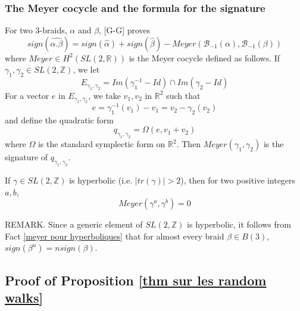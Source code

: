 \documentclass[12pt]{article}
\begin{document}
\subsubsection{The Meyer cocycle and the formula for the signature}\label{meyer}
\label{section sur le meyer cocycle}
For two $3$-braids, $\alpha$ and $\beta$, [G-G] proves  
\begin{equation}\label{formule de gg}
sign(\widehat{\alpha.\beta})=
sign(\hat{\alpha})+sign(\hat{\beta})-
Meyer({\mathcal B}_{-1}(\alpha),{\mathcal B}_{-1}(\beta))
\end{equation}
where $Meyer\in H^2(SL(2,\mathbb{R}))$ is the Meyer cocycle defined as follows.
If $\gamma_1,\gamma_2\in SL(2,\mathbb{Z})$, we let
\begin{equation}\label{e.gamma.un.gamma.deux}
E_{\gamma_1,\gamma_2}=Im(\gamma_1^{-1}-Id)\cap Im(\gamma_2-Id)
\end{equation}
For a vector $e$ in $E_{\gamma_1,\gamma_2}$, we take $v_1,v_2$ in $\mathbb{R}^2$ such that 
$$e=\gamma_1^{-1}(v_1)-v_1=v_2-\gamma_2(v_2)$$
and define the quadratic form 
\begin{equation}\label{e.gamma.un.gamma.deux}
q_{\gamma_1,\gamma_2}=\Omega(e,v_1+v_2)
\end{equation}
where $\Omega$ is the standard symplectic form on $\mathbb{R}^2$.
Then $Meyer (\gamma_1,\gamma_2)$ is the signature of $q_{\gamma_1,\gamma_2}$.







\begin{fact}\label{meyer pour hyperboliques}
	If $\gamma\in SL(2,\mathbb{Z})$ is hyperbolic (i.e. $|tr(\gamma)|>2$), then for two positive integers $a,b$, $$Meyer(\gamma^a,\gamma^b)=0$$
\end{fact}
REMARK. Since a generic element of $SL(2,\mathbb{Z})$ is hyperbolic, it follows from Fact \ref{meyer pour hyperboliques} that for almost every braid $\beta\in B(3)$, $sign(\beta^n)=nsign(\beta)$.



\subsection{Proof of Proposition \ref{thm sur les random walks}}
\end{document}
